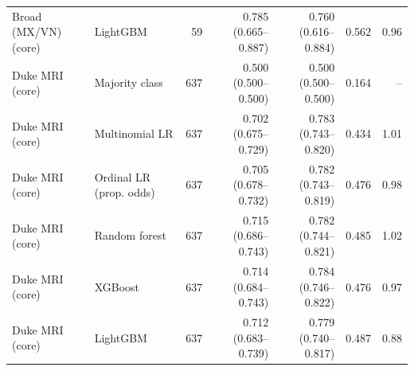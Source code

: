 \begin{tabular}{llrrrrr}
Broad (MX/VN) (core) & LightGBM & 59 & 0.785 (0.665--0.887) & 0.760 (0.616--0.884) & 0.562 & 0.96 \\
\addlinespace
Duke MRI (core) & Majority class & 637 & 0.500 (0.500--0.500) & 0.500 (0.500--0.500) & 0.164 & -- \\
Duke MRI (core) & Multinomial LR & 637 & 0.702 (0.675--0.729) & 0.783 (0.743--0.820) & 0.434 & 1.01 \\
Duke MRI (core) & Ordinal LR (prop. odds) & 637 & 0.705 (0.678--0.732) & 0.782 (0.743--0.819) & 0.476 & 0.98 \\
Duke MRI (core) & Random forest & 637 & 0.715 (0.686--0.743) & 0.782 (0.744--0.821) & 0.485 & 1.02 \\
Duke MRI (core) & XGBoost & 637 & 0.714 (0.684--0.743) & 0.784 (0.746--0.822) & 0.476 & 0.97 \\
Duke MRI (core) & LightGBM & 637 & 0.712 (0.683--0.739) & 0.779 (0.740--0.817) & 0.487 & 0.88 \\
\bottomrule
\end{tabular}